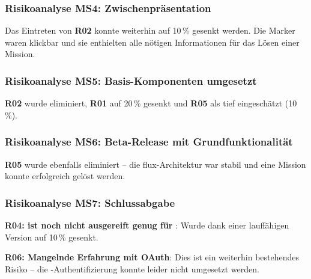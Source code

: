 \subsubsection{Risikoanalyse MS4: Zwischenpräsentation}
Das Eintreten von \textbf{R02} konnte weiterhin auf 10\,\% gesenkt werden. Die Marker waren klickbar und sie enthielten alle nötigen Informationen für das Lösen einer Mission.

\subsubsection{Risikoanalyse MS5: Basis-Komponenten umgesetzt}
\textbf{R02} wurde eliminiert, \textbf{R01} auf 20\,\% gesenkt und \textbf{R05} als tief eingeschätzt (10\,\%).

\subsubsection{Risikoanalyse MS6: Beta-Release mit Grundfunktionalität}
\textbf{R05} wurde ebenfalls eliminiert -- die flux-Architektur war stabil und eine Mission konnte erfolgreich gelöst werden.

\subsubsection{Risikoanalyse MS7: Schlussabgabe}
\textbf{R04:  ist noch nicht ausgereift genug für }: Wurde dank einer lauffähigen Version auf 10\,\% gesenkt.

\textbf{R06: Mangelnde Erfahrung mit \gls{OAuth}}: Dies ist ein weiterhin bestehendes Risiko -- die -Authentifizierung konnte leider nicht umgesetzt werden.